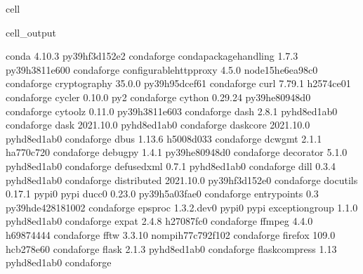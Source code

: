 \documentclass[letterpaper,table,10pt,english]{jupyterBook}
\begin{document}
\begin{sphinxuseclass}{cell}
\begin{sphinxVerbatimOutput}
\begin{sphinxuseclass}{cell_output}
\begin{sphinxVerbatim}[commandchars=\\\{\}]
conda                     4.10.3           py39hf3d152e\PYGZus{}2    conda\PYGZhy{}forge
conda\PYGZhy{}package\PYGZhy{}handling    1.7.3            py39h3811e60\PYGZus{}0    conda\PYGZhy{}forge
configurable\PYGZhy{}http\PYGZhy{}proxy   4.5.0           node15\PYGZus{}he6ea98c\PYGZus{}0    conda\PYGZhy{}forge
cryptography              35.0.0           py39h95dcef6\PYGZus{}1    conda\PYGZhy{}forge
curl                      7.79.1               h2574ce0\PYGZus{}1    conda\PYGZhy{}forge
cycler                    0.10.0                     py\PYGZus{}2    conda\PYGZhy{}forge
cython                    0.29.24          py39he80948d\PYGZus{}0    conda\PYGZhy{}forge
cytoolz                   0.11.0           py39h3811e60\PYGZus{}3    conda\PYGZhy{}forge
dash                      2.8.1              pyhd8ed1ab\PYGZus{}0    conda\PYGZhy{}forge
dask                      2021.10.0          pyhd8ed1ab\PYGZus{}0    conda\PYGZhy{}forge
dask\PYGZhy{}core                 2021.10.0          pyhd8ed1ab\PYGZus{}0    conda\PYGZhy{}forge
dbus                      1.13.6               h5008d03\PYGZus{}3    conda\PYGZhy{}forge
dcw\PYGZhy{}gmt                   2.1.1                ha770c72\PYGZus{}0    conda\PYGZhy{}forge
debugpy                   1.4.1            py39he80948d\PYGZus{}0    conda\PYGZhy{}forge
decorator                 5.1.0              pyhd8ed1ab\PYGZus{}0    conda\PYGZhy{}forge
defusedxml                0.7.1              pyhd8ed1ab\PYGZus{}0    conda\PYGZhy{}forge
dill                      0.3.4              pyhd8ed1ab\PYGZus{}0    conda\PYGZhy{}forge
distributed               2021.10.0        py39hf3d152e\PYGZus{}0    conda\PYGZhy{}forge
docutils                  0.17.1                   pypi\PYGZus{}0    pypi
ducc0                     0.23.0           py39h5a03fae\PYGZus{}0    conda\PYGZhy{}forge
entrypoints               0.3             py39hde42818\PYGZus{}1002    conda\PYGZhy{}forge
epsproc                   1.3.2.dev0               pypi\PYGZus{}0    pypi
exceptiongroup            1.1.0              pyhd8ed1ab\PYGZus{}0    conda\PYGZhy{}forge
expat                     2.4.8                h27087fc\PYGZus{}0    conda\PYGZhy{}forge
ffmpeg                    4.4.0                h6987444\PYGZus{}4    conda\PYGZhy{}forge
fftw                      3.3.10          nompi\PYGZus{}h77c792f\PYGZus{}102    conda\PYGZhy{}forge
firefox                   109.0                hcb278e6\PYGZus{}0    conda\PYGZhy{}forge
flask                     2.1.3              pyhd8ed1ab\PYGZus{}0    conda\PYGZhy{}forge
flask\PYGZhy{}compress            1.13               pyhd8ed1ab\PYGZus{}0    conda\PYGZhy{}forge

\end{sphinxVerbatim}
\end{sphinxuseclass}
\end{sphinxVerbatimOutput}
\end{sphinxuseclass}
\end{document}
